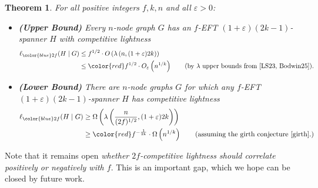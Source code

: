 \documentclass{article}
\theoremstyle{plain}
\newtheorem{theorem}{Theorem}
\theoremstyle{definition}
\newcommand{\eps}{\varepsilon}
\begin{document}
\begin{theorem} \label{thm:introsmallcomp}
For all positive integers $f, k, n$ and all $\eps > 0$:
\begin{itemize}
\item \textbf{(Upper Bound)} Every $n$-node graph $G$ has an $f$-EFT $(1+\eps)(2k-1)$-spanner $H$ with competitive lightness
     \begin{align*}
     \ell_{\color{blue} 2f}(H \mid G) &\le f^{1/2} \cdot O\left(\lambda\left( n, (1+\eps)2k\right)\right)\\
                         &\le {\color{red} f^{1/2}} \cdot O_{\eps}\left(n^{1/k}\right) \tag{by $\lambda$ upper bounds from \cite{LS23, Bodwin25}}.
     \end{align*}

\item \textbf{(Lower Bound)} There are $n$-node graphs $G$ for which any $f$-EFT $(1+\eps)(2k-1)$-spanner $H$ has competitive lightness
     \begin{align*}
     \ell_{\color{blue} 2f}(H \mid G) &\ge \Omega\left(\lambda\left(\frac{n}{(2f)^{1/2}}, (1+\eps)2k\right)\right)\\
                         &\ge {\color{red} f^{-\frac{1}{2k}}} \cdot \Omega\left(n^{1/k}\right) \tag{assuming the girth conjecture \cite{girth}.}
     \end{align*}
\end{itemize}
\end{theorem}

Note that it remains open \emph{whether $2f$-competitive lightness should correlate positively or negatively with $f$}.
This is an important gap, which we hope can be closed by future work.
\end{document}
